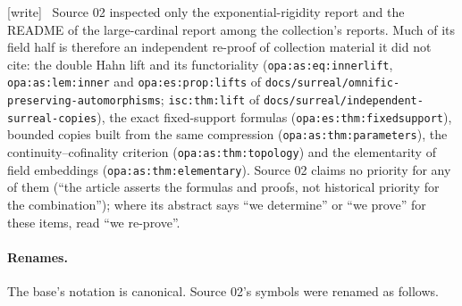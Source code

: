 \documentclass[11pt,a4paper]{article}
\numberwithin{equation}{section}
\theoremstyle{plain}
\theoremstyle{definition}
\theoremstyle{remark}
\newcommand{\lbl}[1]{\nolinkurl{#1}}%
\newcommand{\fn}[1]{\nolinkurl{#1}}%
\newcommand{\wtag}{\textup{\textsf{[write]}}}%
\newenvironment{wnote}{\par\smallskip\noindent\wtag\ }{\par\smallskip}
\begin{document}
\begin{wnote}
Source 02 inspected only the exponential-rigidity report and the README of
the large-cardinal report among the collection's reports. Much of its
field half is therefore an independent re-proof of collection material it
did not cite: the double Hahn lift and its functoriality
(\lbl{opa:as:eq:innerlift}, \lbl{opa:as:lem:inner} and
\lbl{opa:es:prop:lifts} of \fn{docs/surreal/omnific-preserving-automorphisms};
\lbl{isc:thm:lift} of \fn{docs/surreal/independent-surreal-copies}), the exact
fixed-support formulas (\lbl{opa:es:thm:fixedsupport}), bounded copies
built from the same compression (\lbl{opa:as:thm:parameters}), the
continuity--cofinality criterion (\lbl{opa:as:thm:topology}) and the
elementarity of field embeddings (\lbl{opa:as:thm:elementary}). Source 02
claims no priority for any of them (``the article asserts the formulas and
proofs, not historical priority for the combination''); where its abstract
says ``we determine'' or ``we prove'' for these items, read ``we re-prove''.
\end{wnote}

\paragraph{Renames.} The base's notation is canonical. Source 02's symbols
were renamed as follows.
\end{document}
